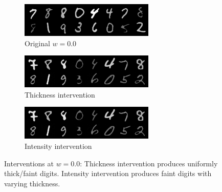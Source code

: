 \documentclass{article}
\begin{document}
	\begin{figure}[H]
		\centering
		\begin{subfigure}{0.32\textwidth}
			\centering
			\includegraphics[width=\textwidth]{images/original_0.0}
			\caption{Original $w=0.0$}
		\end{subfigure}
		\begin{subfigure}{0.32\textwidth}
			\centering
			\includegraphics[width=\textwidth]{images/thickness_0.0}
			\caption{Thickness intervention}
		\end{subfigure}
		\begin{subfigure}{0.32\textwidth}
			\centering
			\includegraphics[width=\textwidth]{images/intensity_0.0}
			\caption{Intensity intervention}
		\end{subfigure}
		\caption{Interventions at $w=0.0$: Thickness intervention produces uniformly thick/faint digits. Intensity intervention produces faint digits with varying thickness.}
		\label{fig:w0}
	\end{figure}
	
\end{document}
